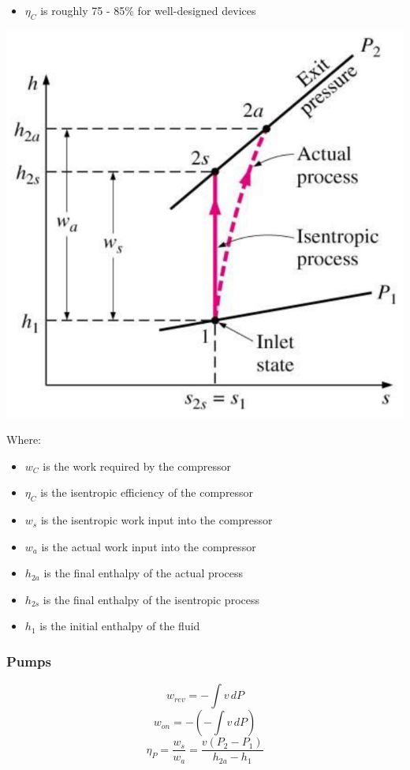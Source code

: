 \documentclass[11pt]{article}
\begin{document}
\begin{itemize}
\item \(\eta_C\) is roughly 75 - 85\% for well-designed devices
\end{itemize}

\begin{center}
\includegraphics[scale=0.8]{./images/isentropic-efficiency-of-compressors.png}
\end{center}

Where:
\begin{itemize}
\item \(w_C\) is the work required by the compressor
\item \(\eta_C\) is the isentropic efficiency of the compressor
\item \(w_s\) is the isentropic work input into the compressor
\item \(w_a\) is the actual work input into the compressor
\item \(h_{2a}\) is the final enthalpy of the actual process
\item \(h_{2s}\) is the final enthalpy of the isentropic process
\item \(h_1\) is the initial enthalpy of the fluid
\end{itemize}

\subsubsection{Pumps}
\label{sec:org9485068}
\[w_{rev} = - \int v \, dP\]
\[w_{on} = - \left(- \int v \, dP \right)\]
\[\eta_P = \frac{w_s}{w_a} = \frac{v \left(P_2 - P_1 \right)}{h_{2a} - h_1}\]
\end{document}
